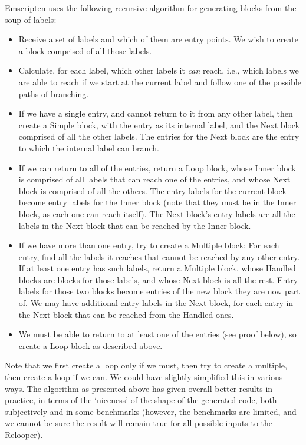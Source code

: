 \documentclass[11pt]{proc}
\begin{document}
Emscripten uses the following recursive algorithm for generating
blocks from the soup of labels:

\begin{itemize}
\item Receive a set of labels and which of them are entry points.
      We wish to create a block comprised of all those labels.
\item Calculate, for each label, which other labels it \emph{can}
      reach, i.e., which labels we are able to reach if we start
      at the current label and follow one of the possible paths
      of branching.
\item If we have a single entry, and cannot return to it from
      any other label, then create a Simple block, with the entry
      as its internal label, and the Next block comprised of all
      the other labels. The entries for the Next block are the entry
      to which the internal label can branch.
\item If we can return to all of the entries, return a
      Loop block, whose Inner block is comprised of all labels that
      can reach one of the entries, and whose Next block is
      comprised of all the others. The entry labels for the current
      block become entry labels for the Inner block (note that
      they must be in the Inner block, as each one can reach
      itself). The Next block's entry labels are all the labels
      in the Next block that can be reached by the Inner block.
\item If we have more than one entry, try to create a Multiple block: For each entry, find all
      the labels it reaches that cannot be reached by any other
      entry. If at least one entry has such labels, return a
      Multiple block, whose Handled blocks are blocks for those
      labels, and whose Next block is all the rest. Entry labels
      for those two blocks become entries of the new block they are now part of.
      We may have additional entry labels in the Next block, for
      each entry in the Next block that can be reached from the Handled ones.
\item We must be able to return to at least one of the entries (see proof below), so create
      a Loop block as described above.
\end{itemize}
Note that we first create a loop only if we must, then try to create a
multiple, then create a loop if we can. We could have slightly simplified this in
various ways. The algorithm as presented above has given overall better
results in practice, in terms of the `niceness' of the shape of the
generated code, both subjectively and in some benchmarks (however,
the benchmarks are limited, and we cannot be sure the result will
remain true for all possible inputs to the Relooper).
\end{document}

